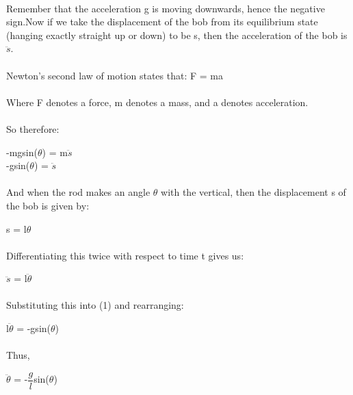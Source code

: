 \documentclass{article}
\begin{document}
\paragraph{}Remember that the acceleration g is moving downwards, hence the negative sign.Now if we take the displacement of the bob from its equilibrium state (hanging exactly straight up or down) to be s, then the acceleration of the bob is $\ddot{s}$.
\paragraph{}Newton’s second law of motion states that: F = ma
\paragraph{}Where F denotes a force, m denotes a mass, and a denotes acceleration.
\paragraph{}So therefore: \begin{center}
-mgsin($\theta$) = m$\ddot{s}$ \\ -gsin($\theta$) = $\ddot{s}$
\end{center}
\paragraph{}And when the rod makes an angle $\theta$ with the vertical, then the displacement s of the bob is
given by:\begin{center}
s = l$\theta$
\end{center}
\paragraph{}Differentiating this twice with respect to time t gives us:\begin{center}
$\ddot{s}$ = l$\ddot{\theta}$
\end{center}
\paragraph{}Substituting this into (1) and rearranging:\begin{center}
l$\ddot{\theta}$ = -gsin($\theta$)
\end{center}
\paragraph{}Thus,\begin{center}
$\ddot{\theta}$ = -$\dfrac{g}{l}$sin($\theta$)
\end{center}
\end{document}
